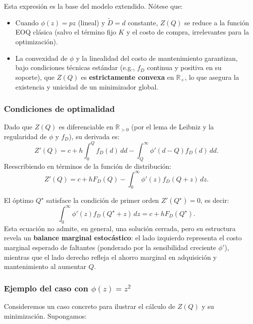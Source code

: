 \documentclass[
  spanish,
  us-letterpaper,
  DIV=11,
  numbers=noendperiod]{scrreprt}
\providecommand{\tightlist}{%
  \setlength{\itemsep}{0pt}\setlength{\parskip}{0pt}}
\numberwithin{equation}{section}
\begin{document}
Esta expresión es la base del modelo extendido. Nótese que:

\begin{itemize}
\tightlist
\item
  Cuando \(\phi(z) = p z\) (lineal) y \(\tilde{D} = d\) constante,
  \(Z(Q)\) se reduce a la función EOQ clásica (salvo el término fijo
  \(K\) y el costo de compra, irrelevantes para la optimización).
\item
  La convexidad de \(\phi\) y la linealidad del costo de mantenimiento
  garantizan, bajo condiciones técnicas estándar (e.g., \(f_D\) continua
  y positiva en su soporte), que \(Z(Q)\) es \textbf{estrictamente
  convexa} en \(\mathbb{R}_{+}\), lo que asegura la existencia y
  unicidad de un minimizador global.
\end{itemize}

\subsubsection{Condiciones de
optimalidad}\label{condiciones-de-optimalidad}

Dado que \(Z(Q)\) es diferenciable en \(\mathbb{R}_{>0}\) (por el lema
de Leibniz y la regularidad de \(\phi\) y \(f_D\)), su derivada es: \[
Z'(Q) = c + h \int_0^Q f_D(d) \, dd - \int_Q^\infty \phi'(d - Q) f_D(d) \, dd.
\] Reescribiendo en términos de la función de distribución: \[
Z'(Q) = c + h F_D(Q) - \int_0^\infty \phi'(z) f_D(Q + z) \, dz.
\]

El óptimo \(Q^\star\) satisface la condición de primer orden
\(Z'(Q^\star) = 0\), es decir: \[
\int_0^\infty \phi'(z) f_D(Q^\star + z) \, dz = c + h F_D(Q^\star).
\] Esta ecuación no admite, en general, una solución cerrada, pero su
estructura revela un \textbf{balance marginal estocástico}: el lado
izquierdo representa el costo marginal esperado de faltantes (ponderado
por la sensibilidad creciente \(\phi'\)), mientras que el lado derecho
refleja el ahorro marginal en adquisición y mantenimiento al aumentar
\(Q\).

\subsubsection{\texorpdfstring{Ejemplo del caso con
\(\phi(z) = z^2\)}{Ejemplo del caso con \textbackslash phi(z) = z\^{}2}}\label{ejemplo-del-caso-con-phiz-z2}

Consideremos un caso concreto para ilustrar el cálculo de \(Z(Q)\) y su
minimización. Supongamos:
\end{document}

